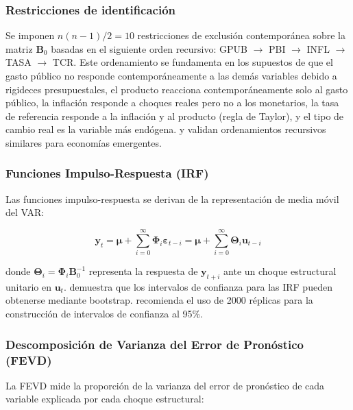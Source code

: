 \documentclass[12pt,a4paper]{article}
\begin{document}
\subsubsection{Restricciones de identificación}

Se imponen $n(n-1)/2 = 10$ restricciones de exclusión contemporánea sobre la matriz $\mathbf{B}_0$ basadas en el siguiente orden recursivo: GPUB $\to$ PBI $\to$ INFL $\to$ TASA $\to$ TCR. Este ordenamiento se fundamenta en los supuestos de que el gasto público no responde contemporáneamente a las demás variables debido a rigideces presupuestales, el producto reacciona contemporáneamente solo al gasto público, la inflación responde a choques reales pero no a los monetarios, la tasa de referencia responde a la inflación y al producto (regla de Taylor), y el tipo de cambio real es la variable más endógena. \citet{christiano1999} y \citet{kim2005} validan ordenamientos recursivos similares para economías emergentes.

\subsubsection{Funciones Impulso-Respuesta (IRF)}

Las funciones impulso-respuesta se derivan de la representación de media móvil del VAR:

\begin{equation}
\mathbf{y}_t = \boldsymbol{\mu} + \sum_{i=0}^{\infty} \boldsymbol{\Phi}_i \boldsymbol{\varepsilon}_{t-i} = \boldsymbol{\mu} + \sum_{i=0}^{\infty} \boldsymbol{\Theta}_i \mathbf{u}_{t-i}
\label{eq:irf}
\end{equation}

donde $\boldsymbol{\Theta}_i = \boldsymbol{\Phi}_i \mathbf{B}_0^{-1}$ representa la respuesta de $\mathbf{y}_{t+i}$ ante un choque estructural unitario en $\mathbf{u}_t$. \citet{littlepohl2015} demuestra que los intervalos de confianza para las IRF pueden obtenerse mediante bootstrap. \citet{kilian2017} recomienda el uso de 2000 réplicas para la construcción de intervalos de confianza al 95\%.

\subsubsection{Descomposición de Varianza del Error de Pronóstico (FEVD)}

La FEVD mide la proporción de la varianza del error de pronóstico de cada variable explicada por cada choque estructural:
\end{document}
